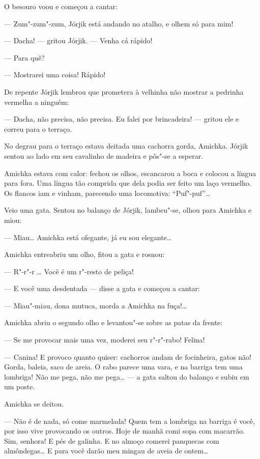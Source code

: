 O besouro voou e começou a cantar:

--- Zum"-zum"-zum, Jórjik está andando no atalho, e olhem só para mim!

--- Dacha! --- gritou Jórjik. --- Venha cá rápido!

--- Para quê?

--- Mostrarei uma coisa! Rápido!

De repente Jórjik lembrou que prometera à velhinha não mostrar a
pedrinha vermelha a ninguém:

--- Dacha, não precisa, não precisa. Eu falei por brincadeira! ---
gritou ele e correu para o terraço.

No degrau para o terraço estava deitada uma cachorra gorda, Amichka.
Jórjik sentou ao lado em seu cavalinho de madeira e pôs"-se a esperar.

Amichka estava com calor: fechou os olhos, escancarou a boca e colocou a
língua para fora. Uma língua tão comprida que dela podia ser feito um
laço vermelho. Os flancos iam e vinham, parecendo uma locomotiva:
``Puf"-puf''\ldots{}

Veio uma gata. Sentou no balanço de Jórjik, lambeu"-se, olhou para Amichka
e miou:

--- Miau\ldots{} Amichka está ofegante, já eu sou elegante\ldots{}

Amichka entreabriu um olho, fitou a gata e rosnou:

--- R"-r"-r \ldots{} Você é um r"-resto de peliça!

--- E você uma desdentada --- disse a gata e começou a cantar:

--- Miau"-miau, dona mutuca, morda a Amichka na fuça!\ldots{}

Amichka abriu o segundo olho e levantou"-se sobre as patas da frente:

--- Se me provocar mais uma vez, moderei seu r"-r"-rabo! Felina!

--- Canina! E provoco quanto quiser: cachorros andam de focinheira,
gatos não! Gorda, baleia, saco de areia. O rabo parece uma vara, e na
barriga tem uma lombriga! Não me pega, não me pega\ldots{} --- a gata saltou
do balanço e subiu em um poste.

Amichka se deitou.

--- Não é de nada, só come marmelada! Quem tem a lombriga na barriga é
você, por isso vive provocando os outros. Hoje de manhã comi sopa com
macarrão. Sim, senhora! E pés de galinha. E no almoço comerei panquecas
com almôndegas\ldots{} E para você darão meu mingau de aveia de ontem\ldots{}

